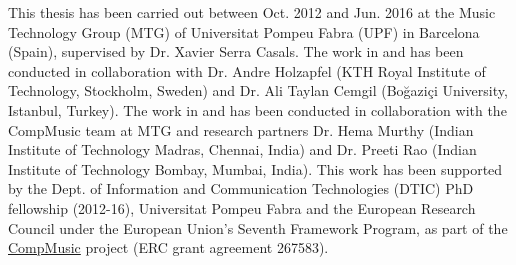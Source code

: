 %
\null
\vfill

{\small \noindent This thesis has been carried out between Oct. 2012 and Jun. 2016 at the Music Technology Group (MTG) of Universitat Pompeu Fabra (UPF) in Barcelona (Spain), supervised by Dr. Xavier Serra Casals. The work in  and  has been conducted in collaboration with Dr. Andre Holzapfel (KTH Royal Institute of Technology, Stockholm, Sweden) and Dr. Ali Taylan Cemgil (Boğaziçi University, Istanbul, Turkey). The work in  and  has been conducted in collaboration with the CompMusic team at MTG and research partners Dr. Hema Murthy (Indian Institute of Technology Madras, Chennai, India) and Dr. Preeti Rao (Indian Institute of Technology Bombay, Mumbai, India). This work has been supported by the Dept. of Information and Communication Technologies (DTIC) PhD fellowship (2012-16), Universitat Pompeu Fabra and the European Research Council under the European Union's Seventh Framework Program, as part of the \href{http://compmusic.upf.edu}{CompMusic} project (ERC grant agreement 267583).\par}
% 

